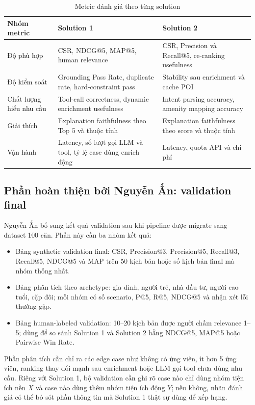 \documentclass[a4paper,12pt]{article}
\begin{document}
\begin{table}[H]
\centering
\caption{Metric đánh giá theo từng solution}
\label{tab:metrics}
\small
\begin{tabularx}{\textwidth}{|P{3.1cm}|Y|Y|}
\hline
\textbf{Nhóm metric} & \textbf{Solution 1} & \textbf{Solution 2} \\ \hline
Độ phù hợp & CSR, NDCG@5, MAP@5, human relevance & CSR, Precision và Recall@5, re-ranking usefulness \\ \hline
Độ kiểm soát & Grounding Pass Rate, duplicate rate, hard-constraint pass & Stability sau enrichment và cache POI \\ \hline
Chất lượng hiểu nhu cầu & Tool-call correctness, dynamic enrichment usefulness & Intent parsing accuracy, amenity mapping accuracy \\ \hline
Giải thích & Explanation faithfulness theo Top 5 và thuộc tính & Explanation faithfulness theo score và thuộc tính \\ \hline
Vận hành & Latency, số lượt gọi LLM và tool, tỷ lệ case dùng enrich động & Latency, quota API và chi phí \\ \hline
\end{tabularx}
\end{table}

\subsection{Phần hoàn thiện bởi Nguyễn Ấn: validation final}
Nguyễn Ấn bổ sung kết quả validation sau khi pipeline được migrate sang dataset 100 căn. Phần này cần ba nhóm kết quả:

\begin{itemize}
    \item Bảng synthetic validation final: CSR, Precision@3, Precision@5, Recall@3, Recall@5, NDCG@5 và MAP trên 50 kịch bản hoặc số kịch bản final mà nhóm thống nhất.
    \item Bảng phân tích theo archetype: gia đình, người trẻ, nhà đầu tư, người cao tuổi, cặp đôi; mỗi nhóm có số scenario, P@5, R@5, NDCG@5 và nhận xét lỗi thường gặp.
    \item Bảng human-labeled validation: 10--20 kịch bản được người chấm relevance 1--5; dùng để so sánh Solution 1 và Solution 2 bằng NDCG@5, MAP@5 hoặc Pairwise Win Rate.
\end{itemize}

Phần phân tích cần chỉ ra các edge case như không có ứng viên, ít hơn 5 ứng viên, ranking thay đổi mạnh sau enrichment hoặc LLM gọi tool chưa đúng nhu cầu. Riêng với Solution 1, bộ validation cần ghi rõ case nào chỉ dùng nhóm tiện ích nền $X$ và case nào dùng thêm nhóm tiện ích động $Y$; nếu không, nhãn đánh giá có thể bỏ sót phần thông tin mà Solution 1 thật sự dùng để xếp hạng.
\end{document}
